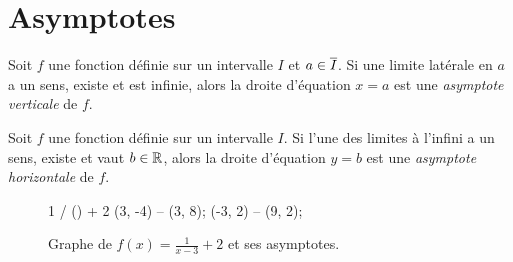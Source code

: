 \documentclass[main.tex]{subfiles}
\begin{document}
\section{Asymptotes}

\begin{definition}

    Soit $f$ une fonction définie sur un intervalle $I$ et $a \in \overline{I}$.
    Si une limite latérale en $a$ a un sens, existe et est infinie,
    alors la droite d'équation $x = a$ est
    une \emph{asymptote verticale} de $f$.
\end{definition}

\begin{definition}

    Soit $f$ une fonction définie sur un intervalle $I$.
    Si l'une des limites à l'infini a un sens, existe et vaut $b \in \mathbb{R}$,
    alors la droite d'équation $y = b$ est
    une \emph{asymptote horizontale} de $f$.
\end{definition}

\begin{figure}
    \centering
    \begin{plot}{0.5}{-3}{-4}{9}{8}
         {1 / () + 2}
        \drawline (3, -4) -- (3, 8);
        \drawline (-3, 2) -- (9, 2);
    \end{plot}
    \caption{Graphe de $f(x) = \frac 1 {x - 3} + 2$ et ses asymptotes.}
\end{figure}
\end{document}
